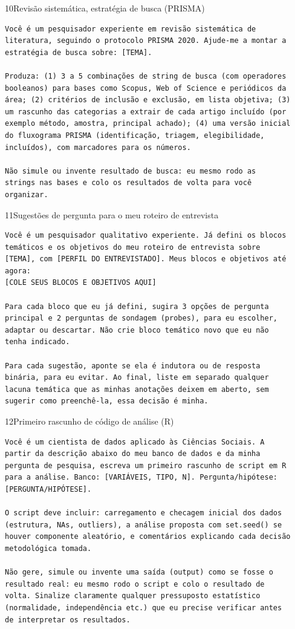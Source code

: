 \documentclass[11pt,a4paper]{article}
\begin{document}
\begin{modelo}{10}{Revisão sistemática, estratégia de busca (PRISMA)}
\begin{lstlisting}
Você é um pesquisador experiente em revisão sistemática de
literatura, seguindo o protocolo PRISMA 2020. Ajude-me a montar a
estratégia de busca sobre: [TEMA].

Produza: (1) 3 a 5 combinações de string de busca (com operadores
booleanos) para bases como Scopus, Web of Science e periódicos da
área; (2) critérios de inclusão e exclusão, em lista objetiva; (3)
um rascunho das categorias a extrair de cada artigo incluído (por
exemplo método, amostra, principal achado); (4) uma versão inicial
do fluxograma PRISMA (identificação, triagem, elegibilidade,
incluídos), com marcadores para os números.

Não simule ou invente resultado de busca: eu mesmo rodo as
strings nas bases e colo os resultados de volta para você
organizar.
\end{lstlisting}
\end{modelo}

\begin{modelo}{11}{Sugestões de pergunta para o meu roteiro de entrevista}
\begin{lstlisting}
Você é um pesquisador qualitativo experiente. Já defini os blocos
temáticos e os objetivos do meu roteiro de entrevista sobre
[TEMA], com [PERFIL DO ENTREVISTADO]. Meus blocos e objetivos até
agora:
[COLE SEUS BLOCOS E OBJETIVOS AQUI]

Para cada bloco que eu já defini, sugira 3 opções de pergunta
principal e 2 perguntas de sondagem (probes), para eu escolher,
adaptar ou descartar. Não crie bloco temático novo que eu não
tenha indicado.

Para cada sugestão, aponte se ela é indutora ou de resposta
binária, para eu evitar. Ao final, liste em separado qualquer
lacuna temática que as minhas anotações deixem em aberto, sem
sugerir como preenchê-la, essa decisão é minha.
\end{lstlisting}
\end{modelo}

\begin{modelo}{12}{Primeiro rascunho de código de análise (R)}
\begin{lstlisting}
Você é um cientista de dados aplicado às Ciências Sociais. A
partir da descrição abaixo do meu banco de dados e da minha
pergunta de pesquisa, escreva um primeiro rascunho de script em R
para a análise. Banco: [VARIÁVEIS, TIPO, N]. Pergunta/hipótese:
[PERGUNTA/HIPÓTESE].

O script deve incluir: carregamento e checagem inicial dos dados
(estrutura, NAs, outliers), a análise proposta com set.seed() se
houver componente aleatório, e comentários explicando cada decisão
metodológica tomada.

Não gere, simule ou invente uma saída (output) como se fosse o
resultado real: eu mesmo rodo o script e colo o resultado de
volta. Sinalize claramente qualquer pressuposto estatístico
(normalidade, independência etc.) que eu precise verificar antes
de interpretar os resultados.
\end{lstlisting}
\end{modelo}
\end{document}
